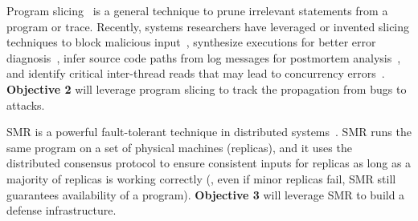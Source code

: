   Program slicing~\cite{Tip:slicing} is a general
technique to prune irrelevant statements from a program or trace.
Recently, systems researchers have leveraged or invented slicing
techniques to block malicious input~\cite{castro:bouncer}, synthesize
executions for better error diagnosis~\cite{esd:eurosys10}, infer source
code paths from log messages for postmortem analysis~\cite{sherlog:asplos10}, 
and identify critical inter-thread reads that may lead to concurrency 
errors~\cite{conseq:asplos11}. \textbf{Objective 2} will leverage program 
slicing to track the propagation from bugs to attacks.

  SMR is a powerful fault-tolerant technique 
in distributed systems~\cite{lamportclock,smr:tutorial}. SMR runs the same program on a set of 
physical machines (replicas), and it uses the 
\paxos~\cite{paxos,paxos:simple,paxos:complex} distributed consensus protocol 
to ensure consistent inputs for replicas as long as a majority of replicas is 
working correctly (\ie, even if minor replicas fail, SMR still guarantees 
availability of a program). \textbf{Objective 3} will leverage SMR to build a 
defense infrastructure.



